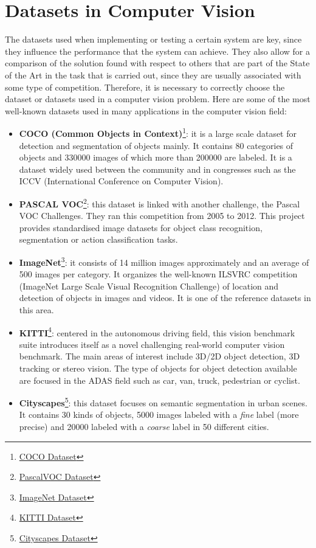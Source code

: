 \section{Datasets in Computer Vision}
The datasets used when implementing or testing a certain system are key, since they influence the performance that the system can achieve. They also allow for a comparison of the solution found with respect to others that are part of the State of the Art in the task that is carried out, since they are usually associated with some type of competition. Therefore, it is necessary to correctly choose the dataset or datasets used in a computer vision problem. Here are some of the most well-known datasets used in many applications in the computer vision field:
\begin{itemize}
\item \textbf{COCO (Common Objects in Context)}\footnote{\href{http://cocodataset.org/#home}{COCO Dataset}}: it is a large scale dataset for detection and segmentation of objects mainly. It contains 80 categories of objects and 330000 images of which more than 200000 are labeled. It is a dataset widely used between the community and in congresses such as the ICCV (International Conference on Computer Vision).
\item \textbf{PASCAL VOC}\footnote {\href{http://host.robots.ox.ac.uk/pascal/VOC/}{PascalVOC Dataset}}: this dataset is linked with another challenge, the Pascal VOC Challenges. They ran this competition from 2005 to 2012. This project provides standardised image datasets for object class recognition, segmentation or action classification tasks.
\item \textbf{ImageNet}\footnote {\href{http://www.image-net.org/}{ImageNet Dataset}}: it consists of 14 million images approximately and an average of 500 images per category. It organizes the well-known ILSVRC competition (ImageNet Large Scale Visual Recognition Challenge) of location and detection of objects in images and videos. It is one of the reference datasets in this area.
\item \textbf{KITTI}\footnote {\href{http://www.cvlibs.net/datasets/kitti/}{KITTI Dataset}}: centered in the autonomous driving field, this vision benchmark suite introduces itself as a novel challenging real-world computer vision benchmark. The main areas of interest include 3D/2D object detection, 3D tracking or stereo vision. The type of objects for object detection available are focused in the ADAS field such as car, van, truck, pedestrian or cyclist.
\item \textbf{Cityscapes}\footnote {\href{https://www.cityscapes-dataset.com/}{Cityscapes Dataset}}: this dataset focuses on semantic segmentation in urban scenes. It contains 30 kinds of objects, 5000 images labeled with a \textit{fine} label (more precise) and 20000 labeled with a \textit{coarse} label in 50 different cities.

\end{itemize}

